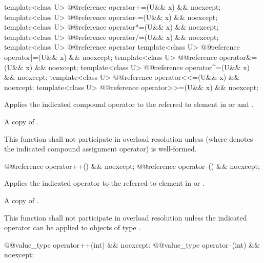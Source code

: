 \begin{itemdecl}
template<class U> @@reference operator+=(U&& x) && noexcept;
template<class U> @@reference operator-=(U&& x) && noexcept;
template<class U> @@reference operator*=(U&& x) && noexcept;
template<class U> @@reference operator/=(U&& x) && noexcept;
template<class U> @@reference operator%
template<class U> @@reference operator|=(U&& x) && noexcept;
template<class U> @@reference operator&=(U&& x) && noexcept;
template<class U> @@reference operator^=(U&& x) && noexcept;
template<class U> @@reference operator<<=(U&& x) && noexcept;
template<class U> @@reference operator>>=(U&& x) && noexcept;
\end{itemdecl}

\begin{itemdescr}
  \pnum\effects
  Applies the indicated compound operator to the referred to element in  or  and .

  \pnum\returns
  A copy of .

  \pnum\remarks
  This function shall not participate in overload resolution unless  (where  denotes the indicated compound assignment operator) is well-formed.
\end{itemdescr}

\begin{itemdecl}
@@reference operator++() && noexcept;
@@reference operator--() && noexcept;
\end{itemdecl}

\begin{itemdescr}
  \pnum\effects
  Applies the indicated operator to the referred to element in  or .

  \pnum\returns
  A copy of .

  \pnum\remarks
  This function shall not participate in overload resolution unless the indicated operator can be applied to objects of type .
\end{itemdescr}

\begin{itemdecl}
@@value_type operator++(int) && noexcept;
@@value_type operator--(int) && noexcept;
\end{itemdecl}

